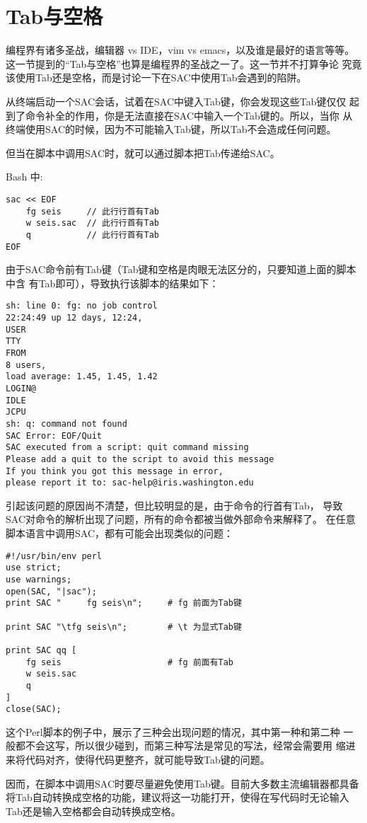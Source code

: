 \section{Tab与空格}
编程界有诸多圣战，编辑器 vs IDE，vim vs emacs，以及谁是最好的语言等等。
这一节提到的``Tab与空格''也算是编程界的圣战之一了。这一节并不打算争论
究竟该使用Tab还是空格，而是讨论一下在SAC中使用Tab会遇到的陷阱。

从终端启动一个SAC会话，试着在SAC中键入Tab键，你会发现这些Tab键仅仅
起到了命令补全的作用，你是无法直接在SAC中输入一个Tab键的。所以，当你
从终端使用SAC的时候，因为不可能输入Tab键，所以Tab不会造成任何问题。

但当在脚本中调用SAC时，就可以通过脚本把Tab传递给SAC。

Bash 中:
\begin{verbatim}
sac << EOF
    fg seis     // 此行行首有Tab
    w seis.sac  // 此行行首有Tab
    q           // 此行行首有Tab
EOF
\end{verbatim}
由于SAC命令前有Tab键（Tab键和空格是肉眼无法区分的，只要知道上面的脚本中含
有Tab即可），导致执行该脚本的结果如下：
\begin{verbatim}
sh: line 0: fg: no job control
22:24:49 up 12 days, 12:24,
USER
TTY
FROM
8 users,
load average: 1.45, 1.45, 1.42
LOGIN@
IDLE
JCPU
sh: q: command not found
SAC Error: EOF/Quit
SAC executed from a script: quit command missing
Please add a quit to the script to avoid this message
If you think you got this message in error,
please report it to: sac-help@iris.washington.edu
\end{verbatim}

引起该问题的原因尚不清楚，但比较明显的是，由于命令的行首有Tab，
导致SAC对命令的解析出现了问题，所有的命令都被当做外部命令来解释了。
在任意脚本语言中调用SAC，都有可能会出现类似的问题：
\begin{verbatim}
#!/usr/bin/env perl
use strict;
use warnings;
open(SAC, "|sac");
print SAC "     fg seis\n";     # fg 前面为Tab键

print SAC "\tfg seis\n";        # \t 为显式Tab键

print SAC qq [
    fg seis                     # fg 前面有Tab
    w seis.sac
    q
]
close(SAC);
\end{verbatim}
这个Perl脚本的例子中，展示了三种会出现问题的情况，其中第一种和第二种
一般都不会这写，所以很少碰到，而第三种写法是常见的写法，经常会需要用
缩进来将代码对齐，使得代码更整齐，就可能导致Tab键的问题。

因而，在脚本中调用SAC时要尽量避免使用Tab键。目前大多数主流编辑器都具备
将Tab自动转换成空格的功能，建议将这一功能打开，使得在写代码时无论输入
Tab还是输入空格都会自动转换成空格。
